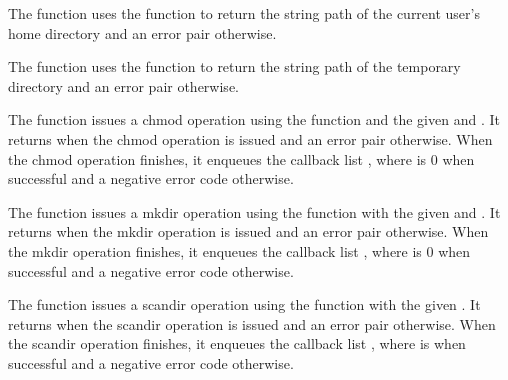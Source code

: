 The  function uses the
 function to return the string path of the
current user's home directory and an error pair otherwise.

\begin{function}
\end{function}

The  function uses the
 function to return the string path of the
temporary directory and an error pair otherwise.

\begin{function}
\end{function}

The  function issues a chmod operation using the
 function and the given  and
. It returns  when the chmod operation is issued
and an error pair otherwise. When the chmod operation finishes, it
enqueues the callback list , where
 is 0 when successful and a negative error code otherwise.

\begin{function}
\end{function}

The  function issues a mkdir operation
using the  function with the given  and
. It returns  when the mkdir operation is issued
and an error pair otherwise. When the mkdir operation finishes, it
enqueues the callback list , where
 is 0 when successful and a negative error code otherwise.

\begin{function}
\end{function}

The  function issues a scandir operation
using the  function with the given
. It returns  when the scandir operation is issued
and an error pair otherwise. When the scandir operation finishes, it
enqueues the callback list , where
 is  when successful and
a negative error code otherwise.

